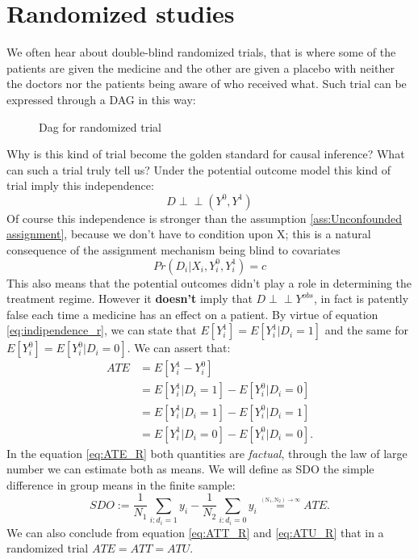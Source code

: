 \section{Randomized studies}
We often hear about double-blind randomized trials, that is where some of the patients are given the medicine and the other are given a placebo with neither the doctors nor the patients being aware of who received what. Such trial can be expressed through a DAG in this way: 
\begin{figure}[H]
\centering
\caption{Dag for randomized trial}
\label{fig:dag_random_EX}
\end{figure}
Why is this kind of trial become the golden standard for causal inference? What can such a trial truly tell us?
Under the potential outcome model this kind of trial imply this independence:
\begin{equation}
D \perp\!\!\!\perp (Y^{0},Y^{1})
\end{equation}
\label{eq:indipendence_r}
Of course this independence is stronger than the assumption \ref{ass:Unconfounded assignment}, because we don't have to condition upon X; this is a natural consequence of the assignment mechanism being blind to covariates $$Pr(D_i| X_i , Y_i^0 ,Y_i^1) = c $$ 
This also means that the potential outcomes didn't play a role in determining the treatment regime. However it \textbf{doesn't} imply that $D \perp\!\!\!\perp Y^{obs}$, in fact is patently false each time a medicine has an effect on a patient. By virtue of equation \ref{eq:indipendence_r}, we can state that $E[Y^1_i] = E[Y^{1}_i | D_i = 1]  $ and the same for $E[Y^0_i] = E[Y^{0}_i | D_i = 0] $.
We can assert that:
\begin{align}
ATE &= E[Y^1_i-Y^0_i ] \\ 
 &= E[Y^{1}_i | D_i = 1]- E[Y^{0}_i | D_i = 0]\label{eq:ATE_R} \\
	& =E[Y^{1}_i | D_i = 1]- E[Y^{0}_i | D_i = 1] \label{eq:ATT_R} \\
 &= E[Y^{1}_i | D_i = 0]- E[Y^{0}_i | D_i = 0]. \label{eq:ATU_R}
  \end{align}
In the equation \ref{eq:ATE_R} both quantities are \textit{factual}, through the law of large number we can estimate both as means. We will define as SDO the simple difference in group means in the finite sample:
$$SDO := \frac{1}{N_1}\sum_{i:d_i=1}y_i - \frac{1}{N_2}\sum_{i:d_i=0}y_i \overset{\underset{\mathrm{(N_1, N_2) \rightarrow \infty}}{}}{=} ATE.$$
We can also conclude from equation \ref{eq:ATT_R} and \ref{eq:ATU_R} that in a randomized trial  $ATE = ATT = ATU$.
